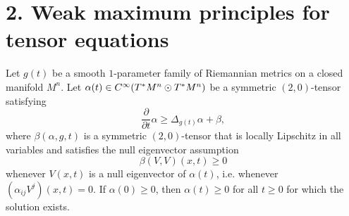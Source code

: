 \section*{2. Weak maximum principles for tensor equations}

\begin{theorem}
\label{ch04-thm-tensor-max-principle-nonnegativity}
Let \(g(t)\) be a smooth \(1\)-parameter family of Riemannian metrics on a closed manifold \(M^n\). Let \(\alpha(t)\in C^\infty(T^*M^n \mathbin{\odot} T^*M^n)\) be a symmetric \((2,0)\)-tensor satisfying
\[
\frac{\partial}{\partial t}\alpha \ge \Delta_{g(t)}\alpha+\beta,
\]
where \(\beta(\alpha,g,t)\) is a symmetric \((2,0)\)-tensor that is locally Lipschitz in all variables and satisfies the null eigenvector assumption
\[
\beta(V,V)(x,t)\ge 0
\]
whenever \(V(x,t)\) is a null eigenvector of \(\alpha(t)\), i.e. whenever \((\alpha_{ij}V^j)(x,t)=0\). If \(\alpha(0)\ge 0\), then \(\alpha(t)\ge 0\) for all \(t\ge 0\) for which the solution exists.
\end{theorem}

